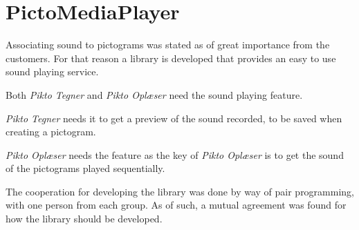 \section{PictoMediaPlayer}
Associating sound to pictograms was stated as of great importance from the customers.
For that reason a library is developed that provides an easy to use sound playing service.

Both \textit{Pikto Tegner} and \textit{Pikto Oplæser} need the sound playing feature. 

\textit{Pikto Tegner} needs it to get a preview of the sound recorded, to be saved when creating a pictogram.

\textit{Pikto Oplæser} needs the feature as the key of \textit{Pikto Oplæser} is to get the sound of the pictograms played sequentially. 

The cooperation for developing the library was done by way of pair programming, with one person from each group.
As of such, a mutual agreement was found for how the library should be developed.






